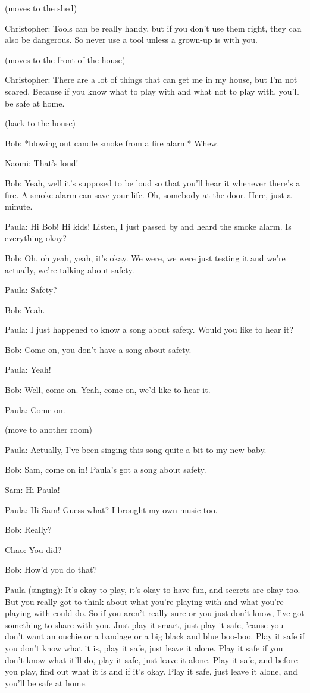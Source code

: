 (moves to the shed)

Christopher: Tools can be really handy, but if you don't use them right, they can also be dangerous. So never use a tool unless a grown-up is with you.

(moves to the front of the house)

Christopher: There are a lot of things that can get me in my house, but I'm not scared. Because if you know what to play with and what not to play with, you'll be safe at home.

(back to the house)

Bob: *blowing out candle smoke from a fire alarm* Whew.

Naomi: That's loud!

Bob: Yeah, well it's supposed to be loud so that you'll hear it whenever there's a fire. A smoke alarm can save your life. Oh, somebody at the door. Here, just a minute.

Paula: Hi Bob! Hi kids! Listen, I just passed by and heard the smoke alarm. Is everything okay?

Bob: Oh, oh yeah, yeah, it's okay. We were, we were just testing it and we're actually, we're talking about safety.

Paula: Safety?

Bob: Yeah.

Paula: I just happened to know a song about safety. Would you like to hear it?

Bob: Come on, you don't have a song about safety.

Paula: Yeah!

Bob: Well, come on. Yeah, come on, we'd like to hear it.

Paula: Come on.

(move to another room)

Paula: Actually, I've been singing this song quite a bit to my new baby.

Bob: Sam, come on in! Paula's got a song about safety.

Sam: Hi Paula!

Paula: Hi Sam! Guess what? I brought my own music too.

Bob: Really?

Chao: You did?

Bob: How'd you do that?

Paula (singing): It's okay to play, it's okay to have fun, and secrets are okay too. But you really got to think about what you're playing with and what you're playing with could do. So if you aren't really sure or you just don't know, I've got something to share with you. Just play it smart, just play it safe, 'cause you don't want an ouchie or a bandage or a big black and blue boo-boo. Play it safe if you don't know what it is, play it safe, just leave it alone. Play it safe if you don't know what it'll do, play it safe, just leave it alone. Play it safe, and before you play, find out what it is and if it's okay. Play it safe, just leave it alone, and you'll be safe at home.

